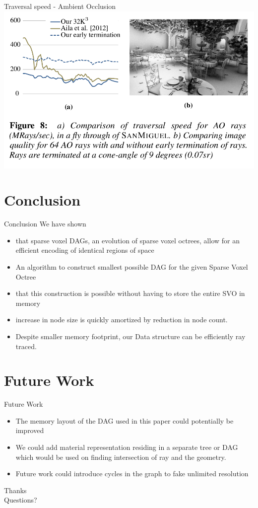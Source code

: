 \documentclass{beamer}
\begin{document}
\begin{frame}{Traversal speed - Ambient Occlusion}
\includegraphics[scale=0.35]{images/AO.png}{}
\end{frame}

\section{Conclusion}
\begin{frame}{Conclusion}
We have shown
\begin{itemize}
	\item that sparse voxel DAGs, an evolution of sparse
voxel octrees, allow for an efficient encoding of identical regions of
space
	\item An algorithm to construct smallest possible DAG for the given Sparse Voxel Octree
	\item that this construction is possible without having to store the entire SVO in memory
	\item increase in node size is quickly amortized by reduction in node count.
	\item Despite smaller memory footprint, our Data structure can be efficiently ray traced.
\end{itemize}

\end{frame}
\section{Future Work}
\begin{frame}{Future Work}
\begin{itemize}
  	\item The memory layout of the DAG used in this paper could potentially
be improved
	\item We could add material representation residing in a separate tree or DAG which would be used on finding intersection of ray and the geometry.
	\item Future work could introduce cycles in the graph to fake unlimited resolution
\end{itemize}
\end{frame}



\begin{frame}
\begin{center}
\Huge{Thanks}\\


\LARGE{Questions?}
\end{center}
\end{frame}
\end{document}
